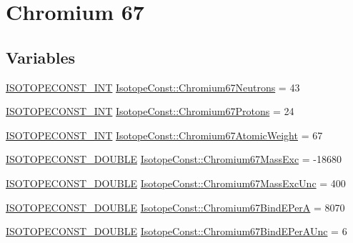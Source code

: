 \hypertarget{group___isotope_const-_chromium-_cr67}{}\section{Chromium 67}
\label{group___isotope_const-_chromium-_cr67}
\subsection*{Variables}
\begin{DoxyCompactItemize}
\item 
\mbox{\hyperlink{group___isotope_const-_macros_ga5f18360b3e99483a35c32d789e62621c}{I\+S\+O\+T\+O\+P\+E\+C\+O\+N\+S\+T\+\_\+\+I\+NT}} \mbox{\hyperlink{group___isotope_const-_chromium-_cr67_ga02136780166fad425c632e2a07fd7ca0}{Isotope\+Const\+::\+Chromium67\+Neutrons}} = 43
\item 
\mbox{\hyperlink{group___isotope_const-_macros_ga5f18360b3e99483a35c32d789e62621c}{I\+S\+O\+T\+O\+P\+E\+C\+O\+N\+S\+T\+\_\+\+I\+NT}} \mbox{\hyperlink{group___isotope_const-_chromium-_cr67_ga03dd0881c270074f38b654fdeb6e49ee}{Isotope\+Const\+::\+Chromium67\+Protons}} = 24
\item 
\mbox{\hyperlink{group___isotope_const-_macros_ga5f18360b3e99483a35c32d789e62621c}{I\+S\+O\+T\+O\+P\+E\+C\+O\+N\+S\+T\+\_\+\+I\+NT}} \mbox{\hyperlink{group___isotope_const-_chromium-_cr67_ga22575eecc8a73bc46a26c218af7e0134}{Isotope\+Const\+::\+Chromium67\+Atomic\+Weight}} = 67
\item 
\mbox{\hyperlink{group___isotope_const-_macros_ga8f45a7272ce02c0b4c65c44636ed719a}{I\+S\+O\+T\+O\+P\+E\+C\+O\+N\+S\+T\+\_\+\+D\+O\+U\+B\+LE}} \mbox{\hyperlink{group___isotope_const-_chromium-_cr67_ga73cec639acdfa84a212304a5454660eb}{Isotope\+Const\+::\+Chromium67\+Mass\+Exc}} = -\/18680
\item 
\mbox{\hyperlink{group___isotope_const-_macros_ga8f45a7272ce02c0b4c65c44636ed719a}{I\+S\+O\+T\+O\+P\+E\+C\+O\+N\+S\+T\+\_\+\+D\+O\+U\+B\+LE}} \mbox{\hyperlink{group___isotope_const-_chromium-_cr67_gab0522a658542932918a12926ce1d7159}{Isotope\+Const\+::\+Chromium67\+Mass\+Exc\+Unc}} = 400
\item 
\mbox{\hyperlink{group___isotope_const-_macros_ga8f45a7272ce02c0b4c65c44636ed719a}{I\+S\+O\+T\+O\+P\+E\+C\+O\+N\+S\+T\+\_\+\+D\+O\+U\+B\+LE}} \mbox{\hyperlink{group___isotope_const-_chromium-_cr67_gae00cd936eb6c5313eadf36813279bd8e}{Isotope\+Const\+::\+Chromium67\+Bind\+E\+PerA}} = 8070
\item 
\mbox{\hyperlink{group___isotope_const-_macros_ga8f45a7272ce02c0b4c65c44636ed719a}{I\+S\+O\+T\+O\+P\+E\+C\+O\+N\+S\+T\+\_\+\+D\+O\+U\+B\+LE}} \mbox{\hyperlink{group___isotope_const-_chromium-_cr67_ga0e28882f759fa0d884ff01ea9bb2e26b}{Isotope\+Const\+::\+Chromium67\+Bind\+E\+Per\+A\+Unc}} = 6

\end{DoxyCompactItemize}
